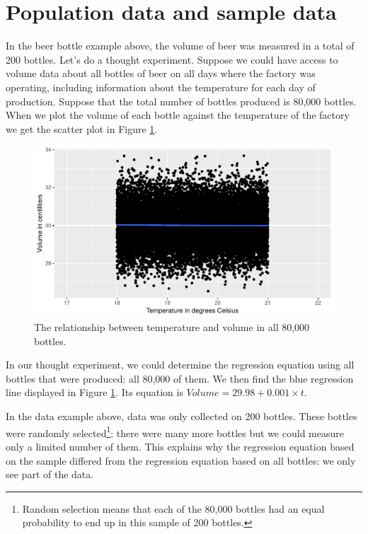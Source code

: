 \documentclass[]{report}\usepackage[]{graphicx}\usepackage[]{color}
\makeatletter
\def\maxwidth{ %
  \ifdim\Gin@nat@width>\linewidth
    \linewidth
  \else
    \Gin@nat@width
  \fi
}
\newenvironment{knitrout}{}{} %
\makeatother
\begin{document}
\section{Population data and sample data}

In the beer bottle example above, the volume of beer was measured in a total of 200 bottles. Let's do a thought experiment. Suppose we could have access to volume data about all bottles of beer on all days where the factory was operating, including information about the temperature for each day of production. Suppose that the total number of bottles produced is 80,000 bottles. When we plot the volume of each bottle against the temperature of the factory we get the scatter plot in Figure \ref{fig:inf_1}.


\begin{knitrout}
\color{fgcolor}\begin{figure}

{\centering \includegraphics[width=\maxwidth]{figure/inf_1-1} 

}

\caption[The relationship between temperature and volume in all 80,000 bottles]{The relationship between temperature and volume in all 80,000 bottles.}\label{fig:inf_1}
\end{figure}


\end{knitrout}


In our thought experiment, we could determine the regression equation using all bottles that were produced: all 80,000 of them. We then find the blue regression line displayed in Figure \ref{fig:inf_1}. Its equation is $Volume = 29.98 + 0.001 \times t$.


In the data example above, data was only collected on 200 bottles. These bottles were randomly selected\footnote{Random selection means that each of the 80,000 bottles had an equal probability to end up in this sample of 200 bottles.}: there were many more bottles but we could measure only a limited number of them. This explains why the regression equation based on the sample differed from the regression equation based on all bottles: we only see part of the data.
\end{document}
